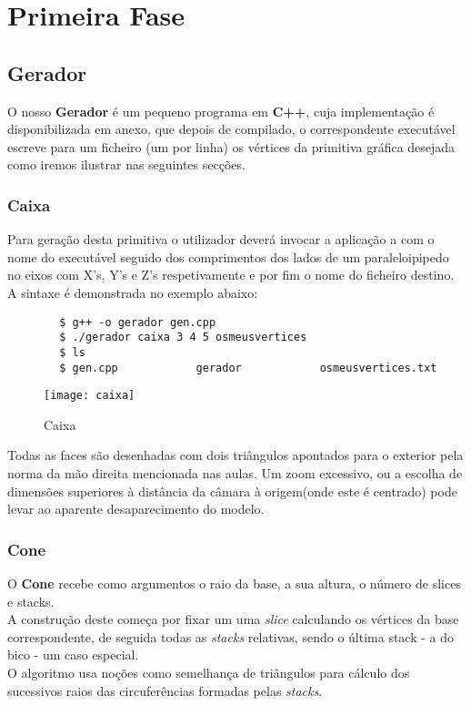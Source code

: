 \documentclass{article}
\begin{document}
\section{Primeira Fase}

\subsection{Gerador}
O nosso \textbf{Gerador} é um pequeno programa em \textbf{C++}, cuja implementação é disponibilizada em anexo, que depois de compilado, o correspondente executável escreve para um ficheiro (um por linha) os vértices da primitiva gráfica desejada  como iremos ilustrar nas seguintes secções.


\subsubsection{Caixa}
Para geração desta primitiva o utilizador deverá invocar a aplicação a com o nome do executável seguido dos comprimentos dos lados de um paraleloipipedo no eixos com X’s, Y’s e Z’s respetivamente e por fim o nome do ficheiro destino. A sintaxe é demonstrada no exemplo abaixo:

\begin{commandline}
    \begin{verbatim}
        $ g++ -o gerador gen.cpp
        $ ./gerador caixa 3 4 5 osmeusvertices
        $ ls
        $ gen.cpp            gerador            osmeusvertices.txt
    \end{verbatim}
\end{commandline}

\begin{figure}[H]
	\centering
	\texttt{[image: caixa]}
	\caption{Caixa}
\end{figure}

\begin{warn}[Notice:]
Todas as faces são desenhadas com dois triângulos apontados para o exterior pela norma da mão direita mencionada nas aulas. Um zoom excessivo, ou a escolha de dimensões superiores à distância da câmara à origem(onde este é centrado)  pode levar ao aparente desaparecimento do modelo.
\end{warn}

\subsubsection{Cone}
O \textbf{Cone} recebe como argumentos o raio da base, a sua altura, o número de slices e stacks. \\
A construção deste começa por fixar um uma \textit{slice} calculando os vértices da base correspondente, de seguida todas as \textit{stacks} relativas, sendo o última stack - a do bico - um caso especial. \\
O algoritmo usa noções como semelhança de triângulos para cálculo dos sucessivos raios das circuferências formadas pelas \textit{stacks}.\\
\end{document}
